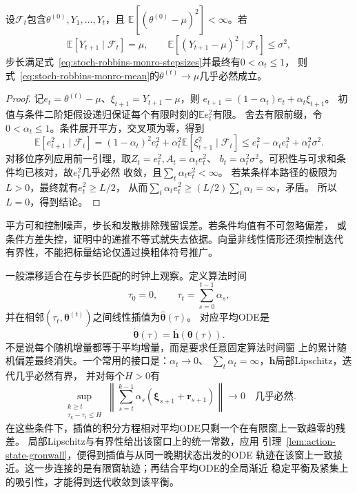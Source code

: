 \begin{theorem}[均值求根的几乎必然收敛]
  \label{thm:stoch-mean-root-convergence}
  设$\mathcal F_t$包含$\theta^{(0)},Y_1,\ldots,Y_t$，且
  $\mathbb E[(\theta^{(0)}-\mu)^2]<\infty$。若
  \[
    \mathbb E[Y_{t+1}\mid\mathcal F_t]=\mu,\qquad
    \mathbb E[(Y_{t+1}-\mu)^2\mid\mathcal F_t]\leq\sigma^2,
  \]
  步长满足式~\eqref{eq:stoch-robbins-monro-stepsizes}并最终有$0<\alpha_t\leq1$，
  则式~\eqref{eq:stoch-robbins-monro-mean}的$\theta^{(t)}\to\mu$几乎必然成立。
\end{theorem}
\begin{proof}
  记$e_t=\theta^{(t)}-\mu$、$\xi_{t+1}=Y_{t+1}-\mu$，则
  $e_{t+1}=(1-\alpha_t)e_t+\alpha_t\xi_{t+1}$。
  初值与条件二阶矩假设递归保证每个有限时刻的$\mathbb E e_t^2$有限。
  舍去有限前缀，令$0<\alpha_t\leq1$。条件展开平方，交叉项为零，得到
  \[
    \mathbb E[e_{t+1}^2\mid\mathcal F_t]
    =(1-\alpha_t)^2e_t^2
      +\alpha_t^2\mathbb E[\xi_{t+1}^2\mid\mathcal F_t]
    \leq e_t^2-\alpha_te_t^2+\alpha_t^2\sigma^2.
  \]
  对移位序列应用前一引理，取$Z_t=e_t^2,A_t=\alpha_te_t^2$、
  $b_t=\alpha_t^2\sigma^2$。可积性与可求和条件均已核对，故$e_t^2$几乎必然
  收敛，且$\sum_t\alpha_te_t^2<\infty$。
  若某条样本路径的极限为$L>0$，最终就有$e_t^2\geq L/2$，
  从而$\sum_t\alpha_te_t^2\geq(L/2)\sum_t\alpha_t=\infty$，矛盾。
  所以$L=0$，得到结论。
\end{proof}
平方可和控制噪声，步长和发散排除残留误差。若条件均值有不可忽略偏差，
或条件方差失控，证明中的递推不等式就失去依据。向量非线性情形还须控制迭代
有界性，不能把标量结论仅通过换粗体符号推广。

一般漂移适合在与步长匹配的时钟上观察。定义算法时间
\begin{equation}
  \tau_0=0,\qquad \tau_t=\sum_{s=0}^{t-1}\alpha_s,
  \label{eq:stoch-algorithmic-time}
\end{equation}
并在相邻$(\tau_t,\bm\theta^{(t)})$之间线性插值为$\widehat{\bm\theta}(\tau)$。
对应平均ODE是
\begin{equation}
  \dot{\bm\theta}(\tau)=\overline{\bm h}(\bm\theta(\tau)).
  \label{eq:stoch-mean-ode}
\end{equation}
不是说每个随机增量都等于平均增量，而是要求任意固定算法时间窗
上的累计随机偏差最终消失。一个常用的接口是：$\alpha_t\to0$、
$\sum_t\alpha_t=\infty$，$\overline{\bm h}$局部Lipschitz，迭代几乎必然有界，
并对每个$H>0$有
\[
  \sup_{\substack{k\geq t\\\tau_k-\tau_t\leq H}}
  \left\|\sum_{s=t}^{k-1}\alpha_s(\bm\xi_{s+1}+\bm r_{s+1})\right\|
  \longrightarrow0\quad\text{几乎必然}.
\]
在这些条件下，插值的积分方程相对平均ODE只剩一个在有限窗上一致趋零的残差。
局部Lipschitz与有界性给出该窗口上的统一常数，应用
引理~\ref{lem:action-state-gronwall}，便得到插值与从同一晚期状态出发的ODE
轨迹在该窗上一致接近。这一步连接的是有限窗轨迹；再结合平均ODE的全局渐近
稳定平衡及紧集上的吸引性，才能得到迭代收敛到该平衡。


